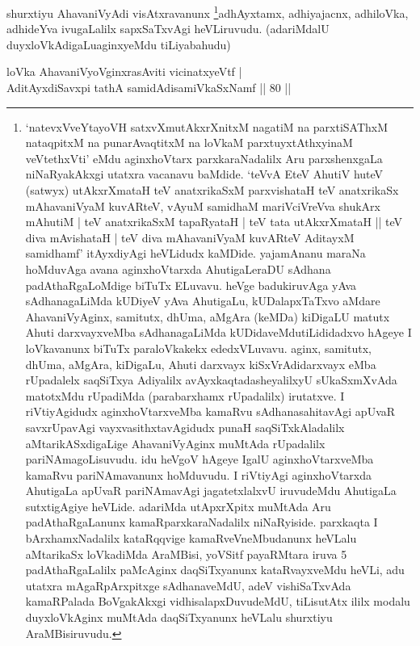 \begin{artha}
shurxtiyu AhavaniVyAdi visAtxravanunx \footnote{`natevxVveYtayoVH satxvXmutAkxrXnitxM nagatiM na parxtiSAThxM nataqpitxM na punarAvaqtitxM na loVkaM parxtuyxtAthxyinaM veVtethxVti' eMdu aginxhoVtarx parxkaraNadalilx Aru parxshenxgaLa niNaRyakAkxgi utatxra vacanavu baMdide. `teVvA EteV AhutiV huteV (satwyx) utAkxrXmataH teV anatxrikaSxM parxvishataH teV anatxrikaSx mAhavaniVyaM kuvARteV, vAyuM samidhaM mariVciVreVva shukArx mAhutiM | teV anatxrikaSxM tapaRyataH | teV tata utAkxrXmataH || teV diva mAvishataH | teV diva mAhavaniVyaM kuvARteV AditayxM samidhamf' itAyxdiyAgi heVLidudx kaMDide. yajamAnanu maraNa hoMduvAga avana aginxhoVtarxda AhutigaLeraDU sAdhana padAthaRgaLoMdige biTuTx ELuvavu. heVge badukiruvAga yAva sAdhanagaLiMda kUDiyeV yAva AhutigaLu, kUDalapxTaTxvo aMdare AhavaniVyAginx, samitutx, dhUma, aMgAra (keMDa) kiDigaLU matutx Ahuti darxvayxveMba sAdhanagaLiMda kUDidaveMdu\break tiLididadxvo hAgeye I loVkavanunx biTuTx paraloVkakekx ededxVLuvavu. aginx, samitutx, dhUma, aMgAra, kiDigaLu, Ahuti darxvayx kiSxVrAdidarxvayx eMba rUpadalelx saqSiTxya Adiyalilx avAyxkaqtadasheyalilxyU sUkaSxmXvAda matotxMdu rUpadiMda (parabarxhamx rUpadalilx) irutatxve. I riVtiyAgidudx aginxhoVtarxveMba kamaRvu sAdhanasahitavAgi apUvaR savxrUpavAgi vayxvasithxtavAgidudx punaH saqSiTxkAladalilx aMtarikASxdigaLige AhavaniVyAginx muMtAda rUpadalilx pariNAmagoLisuvudu. idu heVgoV hAgeye IgalU aginxhoVtarxveMba kamaRvu pariNAmavanunx hoMduvudu. I riVtiyAgi aginxhoVtarxda AhutigaLa apUvaR pariNAmavAgi jagatetxlalxvU iruvudeMdu AhutigaLa sutxtigAgiye heVLide. adariMda utApxrXpitx muMtAda Aru padAthaRgaLanunx kamaRparxkaraNadalilx niNaRyiside. parxkaqta I bArxhamxNadalilx kataRqqvige kamaRveVneMbudanunx heVLalu aMtarikaSx loVkadiMda AraMBisi, yoVSitf payaRMtara iruva 5 padAthaRgaLalilx paMcAginx daqSiTxyanunx kataRvayxveMdu heVLi, adu utatxra mAgaRpArxpitxge sAdhanaveMdU, adeV vishiSaTxvAda kamaRPalada BoVgakAkxgi vidhisalapxDuvudeMdU, tiLisutAtx ililx modalu duyxloVkAginx muMtAda daqSiTxyanunx heVLalu shurxtiyu AraMBisiruvudu.}adhAyxtamx, adhiyajacnx, adhiloVka, adhideYva ivugaLalilx sapxSaTxvAgi heVLiruvudu. (adariMdalU duyxloVkAdigaLu\break aginxyeMdu tiLiyabahudu)
\end{artha}

\begin{shl}
loVka AhavaniVyoV\s ginxrasAviti vicinatxyeVtf | \\
AditAyxdiSavxpi tathA samidAdisamiVkaSxNamf \hfill|| 80 || 
\end{shl}

